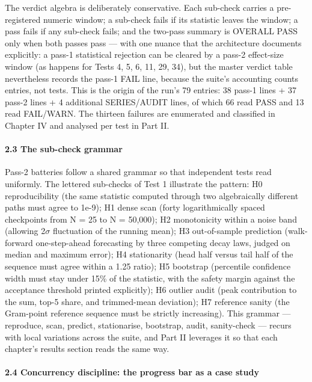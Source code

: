 \documentclass[10pt]{article}
\begin{document}
The verdict algebra is deliberately conservative. Each sub-check carries a pre-registered numeric window; a sub-check fails if its statistic leaves the window; a pass fails if any sub-check fails; and the two-pass summary is OVERALL PASS only when both passes pass --- with one nuance that the architecture documents explicitly: a pass-1 statistical rejection can be cleared by a pass-2 effect-size window (as happens for Tests 4, 5, 6, 11, 29, 34), but the master verdict table nevertheless records the pass-1 FAIL line, because the suite's accounting counts entries, not tests. This is the origin of the run's 79 entries: 38 pass-1 lines + 37 pass-2 lines + 4 additional SERIES/AUDIT lines, of which 66 read PASS and 13 read FAIL/WARN. The thirteen failures are enumerated and classified in Chapter IV and analysed per test in Part II.

\paragraph{2.3 The sub-check grammar}

Pass-2 batteries follow a shared grammar so that independent tests read uniformly. The lettered sub-checks of Test 1 illustrate the pattern: H0 reproducibility (the same statistic computed through two algebraically different paths must agree to 1e-9); H1 dense scan (forty logarithmically spaced checkpoints from N = 25 to N = 50,000); H2 monotonicity within a noise band (allowing 2$\sigma$ fluctuation of the running mean); H3 out-of-sample prediction (walk-forward one-step-ahead forecasting by three competing decay laws, judged on median and maximum error); H4 stationarity (head half versus tail half of the sequence must agree within a 1.25 ratio); H5 bootstrap (percentile confidence width must stay under 15\% of the statistic, with the safety margin against the acceptance threshold printed explicitly); H6 outlier audit (peak contribution to the sum, top-5 share, and trimmed-mean deviation); H7 reference sanity (the Gram-point reference sequence must be strictly increasing). This grammar --- reproduce, scan, predict, stationarise, bootstrap, audit, sanity-check --- recurs with local variations across the suite, and Part II leverages it so that each chapter's results section reads the same way.

\paragraph{2.4 Concurrency discipline: the progress bar as a case study}
\end{document}
